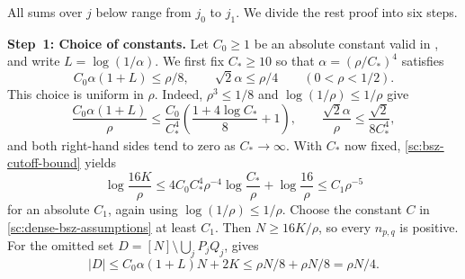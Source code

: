 \documentclass[twoside]{aomart}
\makeatletter
\theoremstyle{paperplain}
\theoremstyle{paperdefinition}
\renewenvironment{proof}[1][\proofname]{\par\pushQED{\qed}%
  \normalfont\topsep6\p@\@plus3\p@\relax\trivlist
  \item[\hskip\labelsep\itshape #1\@addpunct{.}]\ignorespaces
}{\popQED\endtrivlist\@endpefalse}
\numberwithin{equation}{section}
\makeatother
\begin{document}
\begin{proof}
All sums over $j$ below range from $j_0$ to $j_1$. We divide the rest proof into six steps.

\par
\medskip
\noindent\textbf{Step~1: Choice of constants.}
Let $C_0\ge1$ be an absolute constant valid in
, and write $L=\log(1/\alpha)$.
We first fix $C_*\ge10$ so that $\alpha=(\rho/C_*)^4$ satisfies
\begin{equation*}
 C_0\alpha(1+L)\le\rho/8,
 \qquad \sqrt2\alpha\le\rho/4
 \qquad(0<\rho<1/2).
\end{equation*}
This choice is uniform in $\rho$. Indeed,
$\rho^3\le1/8$ and $\log(1/\rho)\le1/\rho$ give
\begin{equation*}
 \frac{C_0\alpha(1+L)}{\rho}
 \le\frac{C_0}{C_*^4}
       \left(\frac{1+4\log C_*}{8}+1\right),
 \qquad
 \frac{\sqrt2\alpha}{\rho}\le\frac{\sqrt2}{8C_*^4},
 \end{equation*}
and both right-hand sides tend to zero as $C_*\to\infty$.
With $C_*$ now fixed, \eqref{sc:bsz-cutoff-bound} yields
\begin{equation}
 \log\frac{16K}{\rho}
 \le4C_0C_*^4\rho^{-4}\log\frac{C_*}{\rho}
       +\log\frac{16}{\rho}
 \le C_1\rho^{-5}
 \label{sc:dense-bsz-size-threshold}
\end{equation}
for an absolute $C_1$, again using $\log(1/\rho)\le1/\rho$.
Choose the constant $C$ in \eqref{sc:dense-bsz-assumptions}
at least $C_1$. Then $N\ge16K/\rho$, so every $n_{p,q}$ is
positive. For the omitted set
$D=[N]\setminus\bigcup_jP_jQ_j$,  gives
\begin{equation}
 |D|\le C_0\alpha(1+L)N+2K
       \le\rho N/8+\rho N/8=\rho N/4.
 \label{sc:dense-bsz-coverage-error}
\end{equation}


\end{proof}
\end{document}
